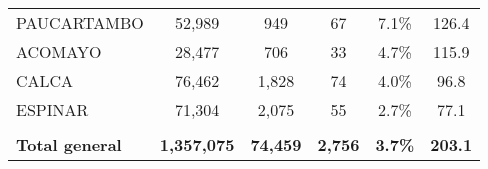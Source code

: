 \begin{tabular}{lccccc}
	\cellcolor[HTML]{FFE699}PAUCARTAMBO                             & 52,989               & 949                        & 67                   & 7.1\%                      & 126.4                                       \\
	\cellcolor[HTML]{FFE699}ACOMAYO                                 & 28,477               & 706                        & 33                   & 4.7\%                      & 115.9                                       \\
	\cellcolor[HTML]{FFE699}CALCA                                   & 76,462               & 1,828                      & 74                   & 4.0\%                      & 96.8                                        \\
	\cellcolor[HTML]{FFE699}ESPINAR                                 & 71,304               & 2,075                      & 55                   & 2.7\%                      & 77.1                                        \\
	& \multicolumn{1}{l}{} & \multicolumn{1}{l}{}       & \multicolumn{1}{l}{} & \multicolumn{1}{l}{}       & \multicolumn{1}{l}{}                        \\
	\rowcolor[HTML]{DDEBF7} 
	\textbf{Total general}                                          & \textbf{1,357,075}   & \textbf{74,459}            & \textbf{2,756}       & \textbf{3.7\%}             & \textbf{203.1}                             
\end{tabular}
 